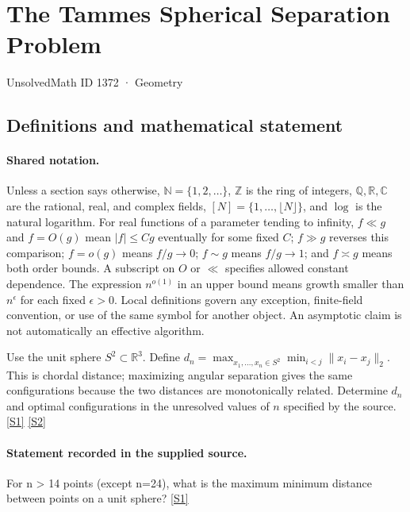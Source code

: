 \documentclass[11pt,a4paper]{article}
\newcommand{\N}{\mathbb{N}}
\newcommand{\Z}{\mathbb{Z}}
\newcommand{\Q}{\mathbb{Q}}
\newcommand{\R}{\mathbb{R}}
\newcommand{\C}{\mathbb{C}}
\newcommand{\sref}[2]{\hyperlink{source:#1:#2}{[S#2]}}
\begin{document}

\setcounter{section}{1371}

\section{The Tammes Spherical Separation Problem}\label{1372}

{\small\sffamily UnsolvedMath ID 1372 · Geometry}

\subsection{Definitions and mathematical statement}

\paragraph{Shared notation.}Unless a section says otherwise, $\N=\{1,2,\ldots\}$,
$\Z$ is the ring of integers, $\Q,\R,\C$ are the rational, real, and complex
fields, $[N]=\{1,\ldots,\lfloor N\rfloor\}$, and $\log$ is the natural
logarithm. For real functions of a parameter tending to infinity,
$f\ll g$ and $f=O(g)$ mean $|f|\leq Cg$ eventually for some fixed $C$;
$f\gg g$ reverses this comparison; $f=o(g)$ means $f/g\to0$;
$f\sim g$ means $f/g\to1$; and $f\asymp g$ means both order bounds.
A subscript on $O$ or $\ll$ specifies allowed constant dependence.
The expression $n^{o(1)}$ in an upper bound means growth smaller than
$n^\epsilon$ for each fixed $\epsilon>0$. Local definitions govern any
exception, finite-field convention, or use of the same symbol for another
object. An asymptotic claim is not automatically an effective algorithm.



Use the unit sphere $S^2\subset\R^3$. Define $d_n=\max_{x_1,\ldots,x_n\in S^2}\min_{i<j}\|x_i-x_j\|_2$. This is chordal distance; maximizing angular separation gives the same configurations because the two distances are monotonically related. Determine $d_n$ and optimal configurations in the unresolved values of $n$ specified by the source. \sref{1372}{1} \sref{1372}{2}

\paragraph{Statement recorded in the supplied source.}
For n > 14 points (except n=24), what is the maximum minimum distance between points on a unit sphere? \sref{1372}{1}
\end{document}

